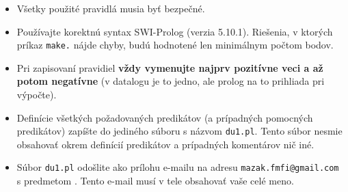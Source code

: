 \documentclass[10pt, a4paper]{article}
\begin{document}
\begin{itemize}
\item Všetky použité pravidlá musia byť bezpečné.
\item Používajte korektnú syntax SWI-Prolog (verzia 5.10.1). Riešenia, v ktorých príkaz {\tt make.} nájde chyby, budú hodnotené len minimálnym počtom bodov.
\item Pri zapisovaní pravidiel {\bf vždy vymenujte najprv pozitívne veci a až potom negatívne} (v datalogu je to jedno, ale prolog na to prihliada pri výpočte).
\item Definície všetkých požadovaných predikátov (a prípadných pomocných predikátov) zapíšte do jediného súboru s názvom {\tt du1.pl}. Tento súbor nesmie obsahovať okrem definícií predikátov a prípadných komentárov nič iné.
\item Súbor {\tt du1.pl} odošlite ako prílohu e-mailu na adresu {\tt mazak.fmfi@gmail.com} s predmetom . Tento e-mail musí v tele obsahovať vaše celé meno.
\end{itemize}
\end{document}
